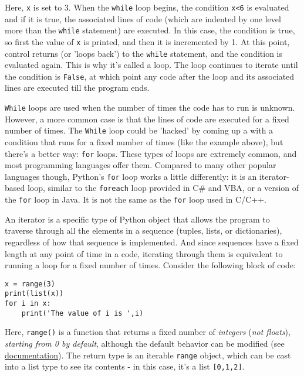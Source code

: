 \documentclass[12pt]{article}
\newcommand{\code}{\texttt}
\begin{document}
Here, \code{x} is set to 3. When the \code{while} loop begins, the condition \code{x<6} is evaluated and if it is true, the associated lines of code (which are indented by one level more than the \code{while} statement) are executed. In this case, the condition is true, so first the value of \code{x} is printed, and then it is incremented by 1. At this point, control returns (or 'loops back') to the \code{while} statement, and the condition is evaluated again. This is why it's called a loop. The loop continues to iterate until the condition is \code{False}, at which point any code after the loop and its associated lines are executed till the program ends.

\code{While} loops are used when the number of times the code has to run is unknown. However, a more common case is that the lines of code are executed for a fixed number of times. The \code{While} loop could be 'hacked' by coming up a with a condition that runs for a fixed number of times (like the example above), but there's a better way: \code{for} loops. These types of loops are extremely common, and most programming languages offer them. Compared to many other popular languages though, Python's \code{for} loop works a little differently: it is an iterator-based loop, similar to the \code{foreach} loop provided in C\# and VBA, or a version of the \code{for} loop in Java. It is not the same as the \code{for} loop used in C/C++.

An iterator is a specific type of Python object that allows the program to traverse through all the elements in a sequence (tuples, lists, or dictionaries), regardless of how that sequence is implemented. And since sequences have a fixed length at any point of time in a code, iterating through them is equivalent to running a loop for a fixed number of times. Consider the following block of code:

\begin{lstlisting}[frame=single] 
x = range(3)
print(list(x))
for i in x:
    print('The value of i is ',i)
\end{lstlisting}

Here, \code{range()} is a function that returns a fixed number of \textit{integers} (\textit{not floats}), \textit{starting from 0 by default}, although the default behavior can be modified (see \href{https://docs.python.org/3/library/functions.html#func-range}{documentation}). The return type is an iterable \code{range} object, which can be cast into a list type to see its contents - in this case, it's a list \code{[0,1,2]}.
\end{document}
